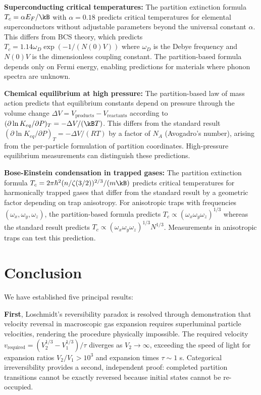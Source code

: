 \textbf{Superconducting critical temperatures:} The partition extinction formula $T_c = \alpha E_F/\kB$ with $\alpha = 0.18$ predicts critical temperatures for elemental superconductors without adjustable parameters beyond the universal constant $\alpha$. This differs from BCS theory, which predicts $T_c = 1.14 \omega_D \exp(-1/(N(0)V))$ where $\omega_D$ is the Debye frequency and $N(0)V$ is the dimensionless coupling constant. The partition-based formula depends only on Fermi energy, enabling predictions for materials where phonon spectra are unknown.

\textbf{Chemical equilibrium at high pressure:} The partition-based law of mass action predicts that equilibrium constants depend on pressure through the volume change $\Delta V = V_{\text{products}} - V_{\text{reactants}}$ according to $(\partial \ln K_{eq}/\partial P)_T = -\Delta V/(\kB T)$. This differs from the standard result $(\partial \ln K_{eq}/\partial P)_T = -\Delta V/(RT)$ by a factor of $N_A$ (Avogadro's number), arising from the per-particle formulation of partition coordinates. High-pressure equilibrium measurements can distinguish these predictions.

\textbf{Bose-Einstein condensation in trapped gases:} The partition extinction formula $T_c = 2\pi\hbar^2(n/\zeta(3/2))^{2/3}/(m\kB)$ predicts critical temperatures for harmonically trapped gases that differ from the standard result by a geometric factor depending on trap anisotropy. For anisotropic traps with frequencies $(\omega_x, \omega_y, \omega_z)$, the partition-based formula predicts $T_c \propto (\omega_x \omega_y \omega_z)^{1/3}$ whereas the standard result predicts $T_c \propto (\omega_x \omega_y \omega_z)^{1/3} N^{1/3}$. Measurements in anisotropic traps can test this prediction.

\section{Conclusion}
\label{sec:conclusion}

We have established five principal results:

\textbf{First}, Loschmidt's reversibility paradox is resolved through demonstration that velocity reversal in macroscopic gas expansion requires superluminal particle velocities, rendering the procedure physically impossible. The required velocity $v_{\text{required}} = (V_2^{1/3} - V_1^{1/3})/\tau$ diverges as $V_2 \to \infty$, exceeding the speed of light for expansion ratios $V_2/V_1 > 10^3$ and expansion times $\tau \sim 1$ s. Categorical irreversibility provides a second, independent proof: completed partition transitions cannot be exactly reversed because initial states cannot be re-occupied.

